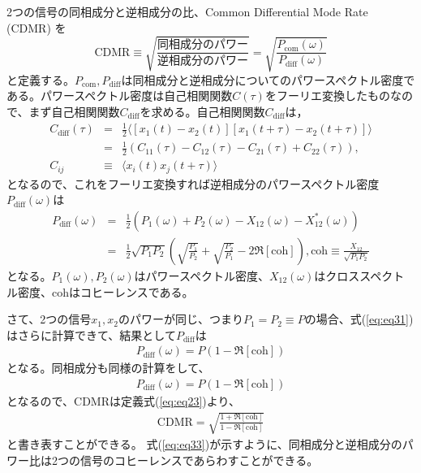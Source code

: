 2つの信号の同相成分と逆相成分の比、Common Differential Mode Rate (CDMR) を
\begin{equation}
  \boxed{\mathrm{CDMR} \equiv \sqrt{\frac{同相成分のパワー}{逆相成分のパワー}} = \sqrt{\frac{P_{\mathrm{com}}(\omega)}{P_{\mathrm{diff}}(\omega)}}} \label{eq:eq23}
\end{equation}
と定義する。$P_{\mathrm{com}},P_{\mathrm{diff}}$は同相成分と逆相成分についてのパワースペクトル密度である。パワースペクトル密度は自己相関関数$C(\tau)$をフーリエ変換したものなので、まず自己相関関数$C_{\mathrm{diff}}$を求める。自己相関関数$C_{\mathrm{diff}}$は，
\begin{eqnarray}
  C_{\mathrm{diff}}(\tau) &=& \frac{1}{2}
  \langle
  \left[ x_{1}(t)-x_{2}(t) \right]   \left[ x_{1}(t+\tau)-x_{2}(t+\tau) \right]
  \rangle \\
  &=& \frac{1}{2}\left( C_{11}(\tau) - C_{12}(\tau) - C_{21}(\tau) + C_{22}(\tau) \right), \\
 C_{ij} &\equiv& \langle x_{i}(t)x_{j}(t+\tau)\rangle 
\end{eqnarray}
となるので、これをフーリエ変換すれば逆相成分のパワースペクトル密度$P_{\mathrm{diff}}(\omega)$は
\begin{eqnarray}
  P_{\mathrm{diff}}(\omega) &=& \frac{1}{2}\left( P_{1}(\omega) + P_{2}(\omega) - X_{12}(\omega) - X_{12}^*(\omega) \right)\\
  &=& \frac{1}{2} \sqrt{P_{1}P_{2}} \left( \sqrt{\frac{P_{1}}{P_{2}}}+ \sqrt{\frac{P_{2}}{P_{1}}} - 2\Re \left[\mathrm{coh} \right] \right) , 
\mathrm{coh} \equiv \frac{X_{12}}{\sqrt{P_{1}P_{2}}} \label{eq:eq31}
\end{eqnarray}
となる。$P_{1}(\omega),P_{2}(\omega)$はパワースペクトル密度、$X_{12}(\omega)$はクロススペクトル密度、$\mathrm{coh}$はコヒーレンスである。


さて、2つの信号$x_{1},x_{2}$のパワーが同じ、つまり$P_{1}=P_{2}\equiv P$の場合、式(\ref{eq:eq31})はさらに計算できて、結果として$P_{\mathrm{diff}}$は
\begin{eqnarray}
 P_{\mathrm{diff}}(\omega) = P \left(1 - \Re \left[\mathrm{coh} \right] \right) \label{eq:eq35}
\end{eqnarray}
となる。同相成分も同様の計算をして、
\begin{eqnarray}
 P_{\mathrm{diff}}(\omega) = P \left(1 - \Re \left[\mathrm{coh} \right] \right) \label{eq:eq36}
\end{eqnarray}
となるので、$\mathrm{CDMR}$は定義式(\ref{eq:eq23})より、
\begin{eqnarray}
 \mathrm{CDMR} = \sqrt{\frac{1 + \Re \left[\mathrm{coh} \right] }{1 - \Re \left[\mathrm{coh} \right]}} \label{eq:eq33}
\end{eqnarray}
と書き表すことができる。
式(\ref{eq:eq33})が示すように、同相成分と逆相成分のパワー比は2つの信号のコヒーレンスであらわすことができる。


